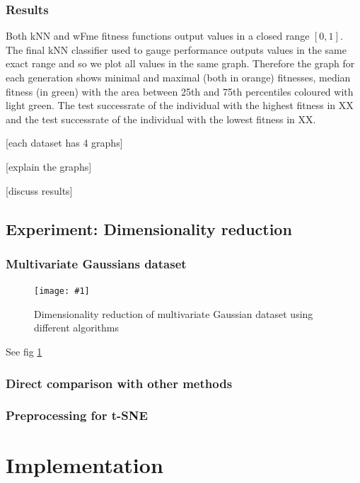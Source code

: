 \documentclass[12pt,a4paper]{report}
\newcommand{\cenfig}[3]{
\begin{figure}[ht]
	\centering
    \texttt{[image: \#1]}
    \caption{#2} \label{#3}
\end{figure}
}
\begin{document}
\subsection{Results}

Both kNN and wFme fitness functions output values in a closed range $[0,1]$. The final kNN classifier used to gauge performance outputs values in the same exact range and so we plot all values in the same graph. Therefore the graph for each generation shows minimal and maximal (both in orange) fitnesses, median fitness (in green) with the area between 25th and 75th percentiles coloured with light green. The test successrate of the individual with the highest fitness in XX and the test successrate of the individual with the lowest fitness in XX.

[each dataset has 4 graphs] %

[explain the graphs] %

[discuss results] %

\section{Experiment: Dimensionality reduction} \label{chap:exp:dimred}

\subsection{Multivariate Gaussians dataset} \label{chap:trivial-dataset}

\cenfig{graphs/dimred/gaussians}{Dimensionality reduction of multivariate Gaussian dataset using different algorithms}{fig:dimred:gauss}

See fig \ref{fig:dimred:gauss}



\subsection{Direct comparison with other methods}

\subsection{Preprocessing for t-SNE}


\chapter{Implementation} \label{chap:impl}
\end{document}
